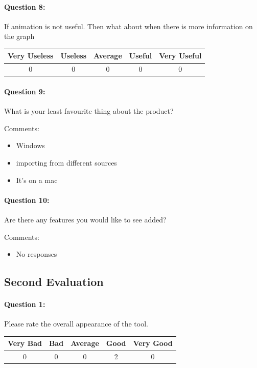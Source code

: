\paragraph*{Question 8: } If animation is not useful.  Then what about when there is more information on the graph

\begin{center}
\begin{tabular}{ | c | c | c | c | c |}
    \hline
    Very Useless & Useless  & Average & Useful & Very Useful \\
    \hline
    0 & 0 & 0 & 0 & 0 \\
    \hline
\end{tabular}
\end{center}

\paragraph*{Question 9: } What is your least favourite thing about the product?

Comments:
\begin{itemize}
\item Windows
\item importing from different sources
\item It's on a mac
\end{itemize}

\paragraph*{Question 10: } Are there any features you would like to see added?

Comments:
\begin{itemize}
\item No responses
\end{itemize}

\clearpage
\subsection{Second Evaluation}

\paragraph*{Question 1: } Please rate the overall appearance of the tool.

\begin{center}
\begin{tabular}{ | c | c | c | c | c |}
    \hline
    Very Bad & Bad & Average & Good & Very Good \\
    \hline
    0 & 0 & 0 & 2 & 0 \\
    \hline
\end{tabular}
\end{center}

